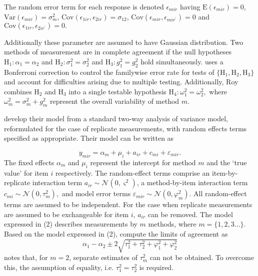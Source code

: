 \documentclass[12pt, a4paper]{report}
\theoremstyle{plain}
\theoremstyle{definition}
\theoremstyle{remark}
\begin{document}
The random error term for each response is denoted $\epsilon_{mir}$ having $\mathrm{E}(\epsilon_{mir})=0$, $\mathrm{Var}(\epsilon_{mir})=\sigma^2_m$, $\mathrm{Cov}(\epsilon_{1ir}, \epsilon_{2 ir})=\sigma_{12}$, $\mathrm{Cov}(\epsilon_{mir}, \epsilon_{mir^\prime})= 0$ and $\mathrm{Cov}(\epsilon_{1ir}, \epsilon_{2 ir^\prime})= 0.$ 


Additionally these parameter are assumed to have Gaussian distribution. Two methods of measurement are in complete agreement if the null hypotheses $\mathrm{H}_1\colon \alpha_1 = \alpha_2$ and $\mathrm{H}_2\colon \sigma^2_1 = \sigma^2_2 $ and $\mathrm{H}_3\colon g^2_1= g^2_2$ hold simultaneously. \citet{roy} uses a Bonferroni correction to control the familywise error rate for tests of $\{\mathrm{H}_1, \mathrm{H}_2, \mathrm{H}_3\}$ and account for difficulties arising due to multiple testing. Additionally, Roy combines $\mathrm{H}_2$ and $\mathrm{H}_3$ into a single testable hypothesis $\mathrm{H}_4\colon \omega^2_1=\omega^2_2,$ where $\omega^2_m = \sigma^2_m + g^2_m$ represent the overall variability of method $m.$


\bigskip

\citet{BXC2008} develop their model from a standard two-way analysis of variance model, reformulated for the case of replicate measurements, with random effects terms specified as appropriate.
Their model can be written as

\begin{equation}\label{BXC-model}
y_{mir}  = \alpha_{m} + \mu_{i} + a_{ir} + c_{mi} + \varepsilon_{mir}.
\end{equation}
The fixed effects $\alpha_{m}$ and $\mu_{i}$ represent the intercept for method $m$ and the `true value' for item $i$ respectively. The random-effect terms comprise an item-by-replicate interaction term $a_{ir} \sim \mathcal{N}(0,\varsigma^{2})$, a method-by-item interaction term $c_{mi} \sim \mathcal{N}(0,\tau^{2}_{m}),$ and model error terms $\varepsilon_{mir} \sim \mathcal{N}(0,\varphi^{2}_{m}).$ All random-effect terms are assumed to be independent. For the case when replicate measurements are assumed to be exchangeable for item $i$, $a_{ir}$ can be removed. The model expressed in (2) describes measurements by $m$ methods, where $m = \{1,2,3\ldots\}$. Based on the model expressed in (2), \citet{BXC2008} compute the limits of agreement as
\[
\alpha_1 - \alpha_2 \pm 2 \sqrt{ \tau^2_1 +  \tau^2_2 +  \varphi^2_1 +  \varphi^2_2 }
\]
\citet{BXC2008} notes that, for $m=2$,  separate estimates of $\tau^2_m$ can not be obtained. To overcome this, the assumption of equality, i.e. $\tau^2_1 = \tau^2_2$ is required.
\end{document}
